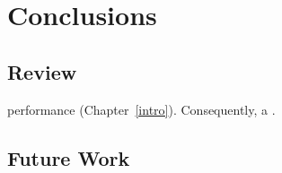 \chapter{Conclusions}
\label{conclusions}

\section{Review}

performance (Chapter~\ref{intro}). Consequently, a 
.
\section{Future Work}



